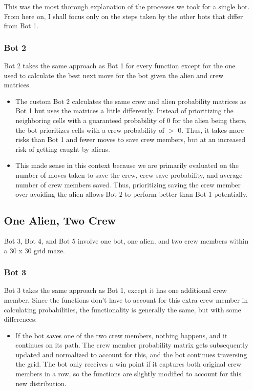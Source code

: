 \documentclass[11pt]{article}
\begin{document}
This was the most thorough explanation of the processes we took for a single bot. From here on, I shall focus only on the steps taken by the other bots that differ from Bot 1.

\subsubsection{Bot 2}

Bot 2 takes the same approach as Bot 1 for every function except for the one used to calculate the best next move for the bot given the alien and crew matrices.

\begin{itemize}
    \item The custom Bot 2 calculates the same crew and alien probability matrices as Bot 1 but uses the matrices a little differently. Instead of prioritizing the neighboring cells with a guaranteed probability of 0 for the alien being there, the bot prioritizes cells with a crew probability of $>$ 0. Thus, it takes more risks than Bot 1 and fewer moves to save crew members, but at an increased risk of getting caught by aliens.
    \item This made sense in this context because we are primarily evaluated on the number of moves taken to save the crew, crew save probability, and average number of crew members saved. Thus, prioritizing saving the crew member over avoiding the alien allows Bot 2 to perform better than Bot 1 potentially.
\end{itemize}

\subsection{One Alien, Two Crew}

Bot 3, Bot 4, and Bot 5 involve one bot, one alien, and two crew members within a 30 x 30 grid maze.

\subsubsection{Bot 3}

Bot 3 takes the same approach as Bot 1, except it has one additional crew member. Since the functions don't have to account for this extra crew member in calculating probabilities, the functionality is generally the same, but with some differences:

\begin{itemize}
    \item If the bot saves one of the two crew members, nothing happens, and it continues on its path. The crew member probability matrix gets subsequently updated and normalized to account for this, and the bot continues traversing the grid. The bot only receives a win point if it captures both original crew members in a row, so the functions are slightly modified to account for this new distribution.
\end{itemize}
\end{document}
